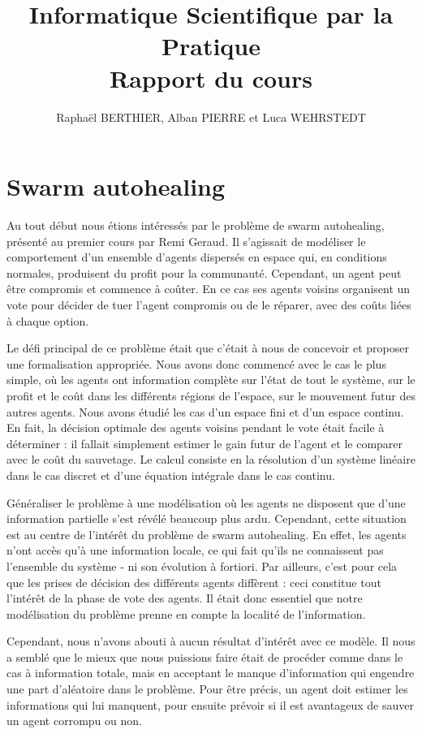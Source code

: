 \documentclass[a4paper,10pt]{article}
\title{Informatique Scientifique par la Pratique\\Rapport du cours}
\author{Raphaël BERTHIER, Alban PIERRE et Luca WEHRSTEDT}
\begin{document}
\maketitle

\section{Swarm autohealing}

Au tout début nous étions intéressés par le problème de swarm autohealing, présenté au premier cours par Remi Geraud. Il s'agissait de modéliser le comportement d'un ensemble d'agents dispersés en espace qui, en conditions normales, produisent du profit pour la communauté. Cependant, un agent peut être compromis et commence à coûter. En ce cas ses agents voisins organisent un vote pour décider de tuer l'agent compromis ou de le réparer, avec des coûts liées à chaque option.

Le défi principal de ce problème était que c’était à nous de concevoir et proposer une formalisation appropriée. Nous avons donc commencé avec le cas le plus simple, où les agents ont information complète sur l’état de tout le système, sur le profit et le coût dans les différents régions de l'espace, sur le mouvement futur des autres agents. Nous avons étudié les cas d'un espace fini et d'un espace continu. En fait, la décision optimale des agents voisins pendant le vote était facile à déterminer : il fallait simplement estimer le gain futur de l'agent et le comparer avec le coût du sauvetage. Le calcul consiste en la résolution d'un système linéaire dans le cas discret et d'une équation intégrale dans le cas continu.

Généraliser le problème à une modélisation où les agents ne disposent que d'une information partielle s'est révélé beaucoup plus ardu. Cependant, cette situation est au centre de l'intérêt du problème de swarm autohealing. En effet, les agents n'ont accès qu'à une information locale, ce qui fait qu'ils ne connaissent pas l'ensemble du système - ni son évolution à fortiori. Par ailleurs, c'est pour cela que les prises de décision des différents agents diffèrent : ceci constitue tout l'intérêt de la phase de vote des agents. Il était donc essentiel que notre modélisation du problème prenne en compte la localité de l'information. 

Cependant, nous n'avons abouti à aucun résultat d'intérêt avec ce modèle. Il nous a semblé que le mieux que nous puissions faire était de procéder comme dans le cas à information totale, mais en acceptant le manque d'information qui engendre une part d'aléatoire dans le problème. Pour être précis, un agent doit estimer les informations qui lui manquent, pour ensuite prévoir si il est avantageux de sauver un agent corrompu ou non. 
\end{document}
